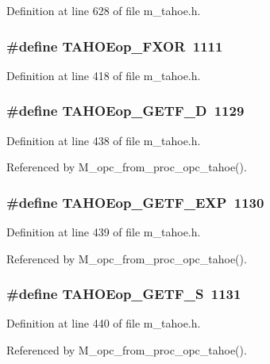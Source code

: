Definition at line 628 of file m\_\-tahoe.h.
\subsubsection{\setlength{\rightskip}{0pt plus 5cm}\#define TAHOEop\_\-FXOR~1111}\label{m__tahoe_8h_d58925bf7db67240b3831481dc8da70e}




Definition at line 418 of file m\_\-tahoe.h.
\subsubsection{\setlength{\rightskip}{0pt plus 5cm}\#define TAHOEop\_\-GETF\_\-D~1129}\label{m__tahoe_8h_1e9611abc20b022d51beb557b3405825}




Definition at line 438 of file m\_\-tahoe.h.

Referenced by M\_\-opc\_\-from\_\-proc\_\-opc\_\-tahoe().
\subsubsection{\setlength{\rightskip}{0pt plus 5cm}\#define TAHOEop\_\-GETF\_\-EXP~1130}\label{m__tahoe_8h_860ebd4d193fdb37c78a2b1f2721fb98}




Definition at line 439 of file m\_\-tahoe.h.

Referenced by M\_\-opc\_\-from\_\-proc\_\-opc\_\-tahoe().
\subsubsection{\setlength{\rightskip}{0pt plus 5cm}\#define TAHOEop\_\-GETF\_\-S~1131}\label{m__tahoe_8h_893521217a0b8faa9de3088a03a67874}




Definition at line 440 of file m\_\-tahoe.h.

Referenced by M\_\-opc\_\-from\_\-proc\_\-opc\_\-tahoe().
